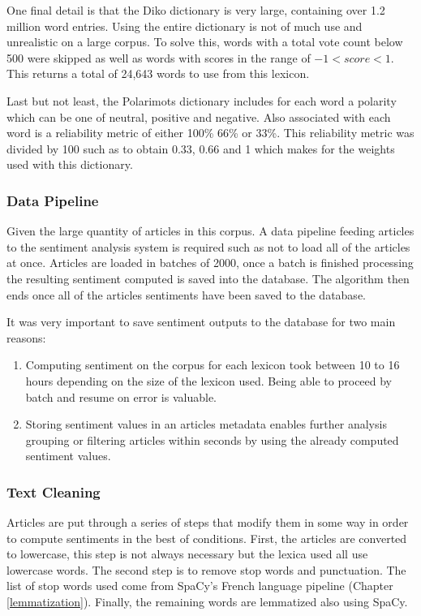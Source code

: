 One final detail is that the Diko dictionary is very large, containing over 1.2 million word entries. Using the entire dictionary is not of much use and unrealistic on a large corpus. To solve this, words with a total vote count below 500 were skipped as well as words with scores in the range of $-1 < score < 1$. This returns a total of 24,643 words to use from this lexicon.

Last but not least, the Polarimots dictionary includes for each word a polarity which can be one of neutral, positive and negative. Also associated with each word is a reliability metric of either 100\% 66\% or 33\%. This reliability metric was divided by 100 such as to obtain 0.33, 0.66 and 1 which makes for the weights used with this dictionary.

\subsubsection{Data Pipeline}

Given the large quantity of articles in this corpus. A data pipeline feeding articles to the sentiment analysis system is required such as not to load all of the articles at once. Articles are loaded in batches of 2000, once a batch is finished processing the resulting sentiment computed is saved into the database. The algorithm then ends once all of the articles sentiments have been saved to the database.

It was very important to save sentiment outputs to the database for two main reasons:
\begin{enumerate}
    \item Computing sentiment on the corpus for each lexicon took between 10 to 16 hours depending on the size of the lexicon used. Being able to proceed by batch and resume on error is valuable.
    \item Storing sentiment values in an articles metadata enables further analysis grouping or filtering articles within seconds by using the already computed sentiment values.
\end{enumerate}

\subsubsection{Text Cleaning}

Articles are put through a series of steps that modify them in some way in order to compute sentiments in the best of conditions. First, the articles are converted to lowercase, this step is not always necessary but the lexica used all use lowercase words. The second step is to remove stop words and punctuation. The list of stop words used come from SpaCy's French language pipeline (Chapter \ref{lemmatization}). Finally, the remaining words are lemmatized also using SpaCy.

